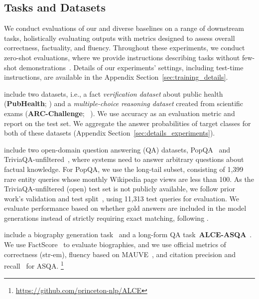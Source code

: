 \subsection{Tasks and Datasets} 
We conduct evaluations of our \model and diverse baselines on a range of downstream tasks, holistically evaluating outputs with metrics designed to assess overall correctness, factuality, and fluency. 
Throughout these experiments, we conduct zero-shot evaluations, where we provide instructions describing tasks without few-shot demonstrations~\citep{wei2022finetuned,sanh2022multitask}. 
Details of our experiments' settings, including test-time instructions, are available in the Appendix Section~\ref{sec:training_details}. 


 include two datasets, i.e., a fact \textit{verification dataset} about public health ({\bf PubHealth}; \citealt{zhang2023interpretable}) and a \textit{multiple-choice reasoning dataset} created from scientific exams ({\bf ARC-Challenge}; ~\citealt{clark2018think}). 
We use accuracy as an evaluation metric and report on the test set. 
We aggregate the answer probabilities of target classes for both of these datasets (Appendix Section~\ref{sec:details_experiments}). 
 

 include two open-domain question answering (QA) datasets, PopQA~\citep{mallen2022not} and TriviaQA-unfiltered~\citep{joshi-etal-2017-triviaqa}, where systems need to answer arbitrary questions about factual knowledge. 
For PopQA, we use the long-tail subset, consisting of 1,399 rare entity queries whose monthly Wikipedia page views are less than 100. 
As the TriviaQA-unfiltered (open) test set is not publicly available, we follow prior work's validation and test split~\citep{min-etal-2019-discrete,guu2020retrieval}, using 11,313 test queries for evaluation. 
We evaluate performance based on whether gold answers are included in the model generations instead of strictly requiring exact matching, following \cite{mallen2022not,schick2023toolformer}. 

 include a biography generation task~\citep{min2023factscore} and a long-form QA task~{\bf ALCE-ASQA}~\cite{gao2023enabling,stelmakh2022asqa}. 
We use FactScore~\citep{min2023factscore} to evaluate biographies, and we use official metrics of correctness (str-em), fluency based on MAUVE~\citep{pillutla2021MAUVE}, and citation precision and recall~\citep{gao2023enabling} for ASQA. \footnote{\url{https://github.com/princeton-nlp/ALCE}} 

